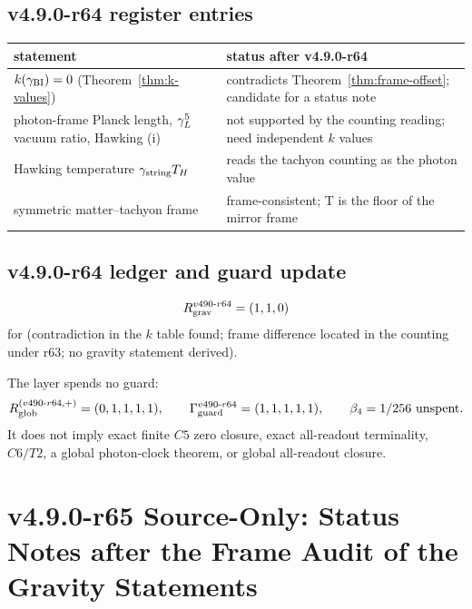 \subsection*{v4.9.0-r64 register entries}
\label{subsec:v490-r64-register}

\begin{center}
\small
\begin{tabular}{@{}>{\raggedright\arraybackslash}p{}>{\raggedright\arraybackslash}p{}@{}}
\toprule
statement & status after v4.9.0-r64\\
\midrule
\(k(\gamma_{\mathrm{BI}})=0\) (Theorem~\ref{thm:k-values}) & contradicts Theorem~\ref{thm:frame-offset}; candidate for a status note\\
photon-frame Planck length, \(\gamma_L^5\) vacuum ratio, Hawking (i) & not supported by the counting reading; need independent \(k\) values\\
Hawking temperature \(\gamma_{\mathrm{string}} T_H\) & reads the tachyon counting as the photon value\\
symmetric matter--tachyon frame & frame-consistent; T is the floor of the mirror frame\\
\bottomrule
\end{tabular}
\end{center}

\subsection*{v4.9.0-r64 ledger and guard update}
\label{subsec:v490-r64-ledger-guard}

\[
R_{\rm grav}^{v490\text{-}r64}=(1,1,0)
\]
for (contradiction in the \(k\) table found; frame difference located in the counting under r63; no gravity statement derived).

The layer spends no guard:
\[
R_{\rm glob}^{(v490\text{-}r64,+)}=(0,1,1,1,1),
\qquad
\Gamma_{\rm guard}^{v490\text{-}r64}=(1,1,1,1,1),
\qquad
\beta_4=1/256\ \text{unspent}.
\]
It does not imply exact finite \(C5\) zero closure, exact all-readout terminality,
\(C6/T2\), a global photon-clock theorem, or global all-readout closure.

\clearpage
\section*{v4.9.0-r65 Source-Only: Status Notes after the Frame Audit of the Gravity Statements}
\label{sec:v490-r65-gravity-status-notes}

